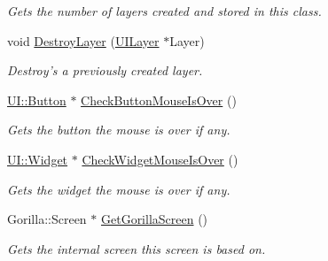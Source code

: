 \begin{DoxyCompactItemize}
\begin{DoxyCompactList}\small\item\em Gets the number of layers created and stored in this class. \item\end{DoxyCompactList}\item 
void \hyperlink{classphys_1_1UIScreen_ac1d9dfc0b8d9b3720f1447dcc93d8b55}{DestroyLayer} (\hyperlink{classphys_1_1UILayer}{UILayer} $\ast$Layer)
\begin{DoxyCompactList}\small\item\em Destroy's a previously created layer. \item\end{DoxyCompactList}\item 
\hyperlink{classphys_1_1UI_1_1Button}{UI::Button} $\ast$ \hyperlink{classphys_1_1UIScreen_a7bc1a10b2172ad8885901de1a65a819d}{CheckButtonMouseIsOver} ()
\begin{DoxyCompactList}\small\item\em Gets the button the mouse is over if any. \item\end{DoxyCompactList}\item 
\hyperlink{classphys_1_1UI_1_1Widget}{UI::Widget} $\ast$ \hyperlink{classphys_1_1UIScreen_a00befef8c7bce9e8d149e6ba03419a53}{CheckWidgetMouseIsOver} ()
\begin{DoxyCompactList}\small\item\em Gets the widget the mouse is over if any. \item\end{DoxyCompactList}\item 
Gorilla::Screen $\ast$ \hyperlink{classphys_1_1UIScreen_a1ec3a329f7864905e6dc387f469068df}{GetGorillaScreen} ()
\begin{DoxyCompactList}\small\item\em Gets the internal screen this screen is based on. \item\end{DoxyCompactList}\end{DoxyCompactItemize}

